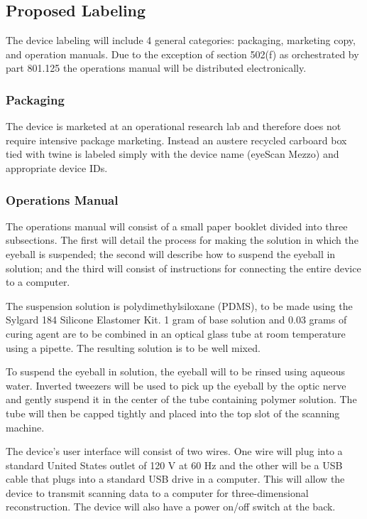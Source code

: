 \subsection{Proposed Labeling}

The device labeling will include 4 general categories: packaging,
marketing copy, and operation manuals. Due to the exception of section
502(f) as orchestrated by part 801.125 the operations manual will be
distributed electronically.

\subsubsection{Packaging}
The device is marketed at an operational research lab and therefore
does not require intensive package marketing. Instead an austere
recycled carboard box tied with twine is labeled simply with the
device name (eyeScan Mezzo) and appropriate device IDs.

\subsubsection{Operations Manual}
The operations manual will consist of a small paper booklet divided
into three subsections. The first will detail the process for making
the solution in which the eyeball is suspended; the second will
describe how to suspend the eyeball in solution; and the third will
consist of instructions for connecting the entire device to a
computer.

The suspension solution is polydimethylsiloxane (PDMS), to be made
using the Sylgard 184 Silicone Elastomer Kit. 1 gram of base solution
and 0.03 grams of curing agent are to be combined in an optical glass
tube at room temperature using a pipette. The resulting solution is to
be well mixed.

To suspend the eyeball in solution, the eyeball will to be rinsed
using aqueous water. Inverted tweezers will be used to pick up the
eyeball by the optic nerve and gently suspend it in the center of the
tube containing polymer solution. The tube will then be capped tightly
and placed into the top slot of the scanning machine.

The device’s user interface will consist of two wires. One wire will
plug into a standard United States outlet of 120 V at 60 Hz and the
other will be a USB cable that plugs into a standard USB drive in a
computer. This will allow the device to transmit scanning data to a
computer for three-dimensional reconstruction. The device will also
have a power on/off switch at the back.

